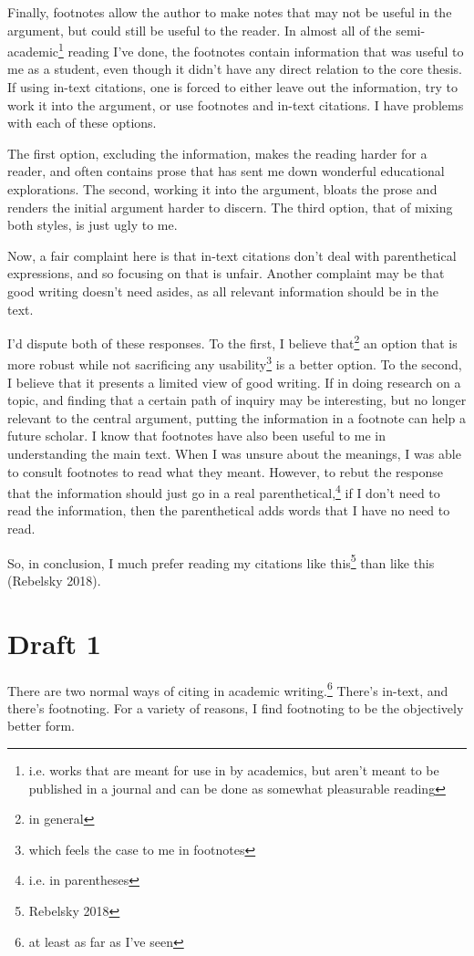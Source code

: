 \documentclass[12pt]{article}[titlepage]
\newcommand{\1}{\={a}}
\newcommand{\2}{\={e}}
\newcommand{\3}{\={\i}}
\newcommand{\4}{\=o}
\newcommand{\5}{\=u}
\newcommand{\6}{\={A}}
\renewcommand{\,}{\textsuperscript{,}}
\begin{document}
Finally, footnotes allow the author to make notes that may not be useful in the argument, but could still be useful to the reader.
In almost all of the semi-academic\footnote{i.e. works that are meant for use in by academics, but aren't meant to be published in a journal and can be done as somewhat pleasurable reading} reading I've done, the footnotes contain information that was useful to me as a student, even though it didn't have any direct relation to the core thesis.
If using in-text citations, one is forced to either leave out the information, try to work it into the argument, or use footnotes and in-text citations.
I have problems with each of these options.

The first option, excluding the information, makes the reading harder for a reader, and often contains prose that has sent me down wonderful educational explorations.
The second, working it into the argument, bloats the prose and renders the initial argument harder to discern.
The third option, that of mixing both styles, is just ugly to me.

Now, a fair complaint here is that in-text citations don't deal with parenthetical expressions, and so focusing on that is unfair.
Another complaint may be that good writing doesn't need asides, as all relevant information should be in the text.

I'd dispute both of these responses.
To the first, I believe that\footnote{in general} an option that is more robust while not sacrificing any usability\footnote{which feels the case to me in footnotes} is a better option.
To the second, I believe that it presents a limited view of good writing.
If in doing research on a topic, and finding that a certain path of inquiry may be interesting, but no longer relevant to the central argument, putting the information in a footnote can help a future scholar.
I know that footnotes have also been useful to me in understanding the main text.
When I was unsure about the meanings, I was able to consult footnotes to read what they meant.
However, to rebut the response that the information should just go in a real parenthetical,\footnote{i.e. in parentheses} if I don't need to read the information, then the parenthetical adds words that I have no need to read.

So, in conclusion, I much prefer reading my citations like this\footnote{Rebelsky 2018} than like this (Rebelsky 2018).
\section{Draft 1}
There are two normal ways of citing in academic writing.\footnote{at least as far as I've seen}
There's in-text, and there's footnoting.
For a variety of reasons, I find footnoting to be the objectively better form.
\end{document}
